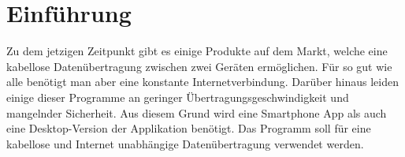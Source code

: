 \section{Einführung}
Zu dem jetzigen Zeitpunkt gibt es einige Produkte auf dem Markt, welche eine kabellose Datenübertragung zwischen zwei Geräten ermöglichen. Für so gut wie alle benötigt man aber eine konstante Internetverbindung. Darüber hinaus leiden einige dieser Programme an geringer Übertragungsgeschwindigkeit und mangelnder Sicherheit. 
Aus diesem Grund wird eine Smartphone App als auch eine Desktop-Version der Applikation benötigt. Das Programm soll für eine kabellose und Internet unabhängige Datenübertragung verwendet werden. 
